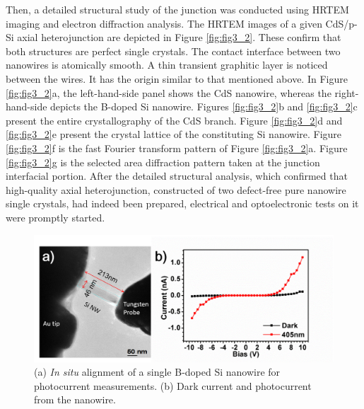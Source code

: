 Then, a detailed structural study of the junction was conducted using HRTEM imaging and electron diffraction analysis. The HRTEM images of a given CdS/p-Si axial heterojunction are depicted in Figure \ref{fig:fig3_2}. These confirm that both structures are perfect single crystals. The contact interface between two nanowires is atomically smooth. A thin transient graphitic layer is noticed between the wires. It has the origin similar to that mentioned above. In Figure \ref{fig:fig3_2}a, the left-hand-side panel shows the CdS nanowire, whereas the right-hand-side depicts the B-doped Si nanowire. Figures \ref{fig:fig3_2}b and \ref{fig:fig3_2}c present the entire crystallography of the CdS branch. Figure \ref{fig:fig3_2}d and \ref{fig:fig3_2}e present the crystal lattice of the constituting Si nanowire. Figure \ref{fig:fig3_2}f is the fast Fourier transform pattern of Figure \ref{fig:fig3_2}a. Figure \ref{fig:fig3_2}g is the selected area diffraction pattern taken at the junction interfacial portion. After the detailed structural analysis, which confirmed that high-quality axial heterojunction, constructed of two defect-free pure nanowire single crystals, had indeed been prepared, electrical and optoelectronic tests on it were promptly started. 

\begin{figure}  
\includegraphics[width=\textwidth]{figures/figure3_s2}
\caption[TEM and currents of a Si NW]{(a) \textit{In situ} alignment of a single B-doped Si nanowire for photocurrent measurements. (b) Dark current and photocurrent from the nanowire. 
\label{fig:fig3_s2}}
\end{figure}

